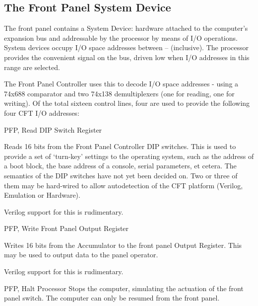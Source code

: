 \subsection{The Front Panel System Device}

The front panel contains a System Device: hardware attached to the computer's
expansion bus and addressable by the processor by means of I/O
operations. System devices occupy I/O space addresses between
– (inclusive). The processor provides the convenient signal 
on the bus, driven low when I/O addresses in this range are selected.

The Front Panel Controller uses this to decode I/O space addresses
- using a 74x688 comparator and two 74x138 demultiplexers
(one for reading, one for writing). Of the total sixteen control lines, four
are used to provide the following four CFT I/O addresses:



%
       {PFP, Read DIP Switch Register}%
       {%
         Reads 16 bits from the Front Panel Controller DIP
         switches. This is used to provide a set of ‘turn-key’
         settings to the operating system, such as the address of a
         boot block, the base address of a console, serial parameters,
         et cetera. The semantics of the DIP switches have not yet
         been decided on. Two or three of them may be hard-wired to
         allow autodetection of the CFT platform (Verilog, Emulation
         or Hardware).

         Verilog support for this is rudimentary.
       }

%
       {PFP, Write Front Panel Output Register}%
       {%
         Writes 16 bits from the \gls{Accumulator} to the front panel
         Output Register. This may be used to output data to the panel operator.

         Verilog support for this is rudimentary.
       }

%
       {PFP, Halt Processor}%
       {%
         Stops the computer, simulating the actuation of the front
         panel  switch. The computer can only be resumed from
         the front panel.
       }

